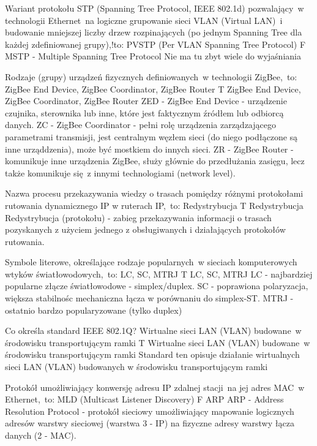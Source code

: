 \answer
{Wariant protokołu STP (Spanning Tree Protocol, IEEE 802.1d) pozwalający~w technologii Ethernet~na logiczne grupowanie sieci VLAN (Virtual LAN)~i budowanie mniejszej liczby drzew rozpinających (po jednym Spanning Tree dla każdej zdefiniowanej grupy),!to:}
{PVSTP (Per VLAN Spanning Tree Protocol)}
{F}
{MSTP - Multiple Spanning Tree Protocol}
{Nie ma tu zbyt wiele do wyjaśniania}

\answer
{Rodzaje (grupy) urządzeń fizycznych definiowanych~w technologii ZigBee,~to:}
{ZigBee End Device, ZigBee Coordinator, ZigBee Router}
{T}
{ZigBee End Device, ZigBee Coordinator, ZigBee Router}
{ZED - ZigBee End Device - urządzenie czujnika, sterownika lub inne, które jest faktycznym źródłem lub odbiorcą danych.
ZC - ZigBee Coordinator - pełni rolę urządzenia zarządzającego parametrami transmisji, jest centralnym węzłem sieci (do niego podłączone są inne urząddzenia), może być mostkiem do innych sieci.
ZR - ZigBee Router - komunikuje inne urządzenia ZigBee, służy głównie do przedłużania zasięgu, lecz także komunikuje się~z innymi technologiami (network level).}

\answer
{Nazwa procesu przekazywania wiedzy o trasach pomiędzy różnymi protokołami rutowania dynamicznego IP w ruterach IP,~to:}
{Redystrybucja}
{T}
{Redystrybucja}
{Redystrybucja (protokołu) - zabieg przekazywania informacji o trasach pozyskanych z użyciem jednego  z obsługiwanych i działających protokołów rutowania.}

\answer
{Symbole literowe, określające rodzaje popularnych~w sieciach komputerowych wtyków światłowodowych,~to:}
{LC, SC, MTRJ}
{T}
{LC, SC, MTRJ}
{LC - najbardziej popularne złącze światłowodowe - simplex/duplex.
SC - poprawiona polaryzacja, większa stabilnośc mechaniczna łącza w porównaniu do simplex-ST.
MTRJ - ostatnio bardzo popularyzowane (tylko duplex)}

\answer
{Co określa standard IEEE 802.1Q?}
{Wirtualne sieci LAN (VLAN) budowane~w środowisku transportującym ramki}
{T}
{Wirtualne sieci LAN (VLAN) budowane~w środowisku transportującym ramki}
{Standard ten opisuje działanie wirtualnych sieci LAN (VLAN) budowanych w środowisku transportującym ramki}

\answer
{Protokół umożliwiający konwersję adresu IP zdalnej stacji~na jej adres MAC~w Ethernet,~to:}
{MLD (Multicast Listener Discovery)}
{F}
{ARP}
{ARP - Address Resolution Protocol -  protokół sieciowy umożliwiający mapowanie logicznych adresów warstwy sieciowej (warstwa 3 - IP) na fizyczne adresy warstwy łącza danych (2 - MAC).}

